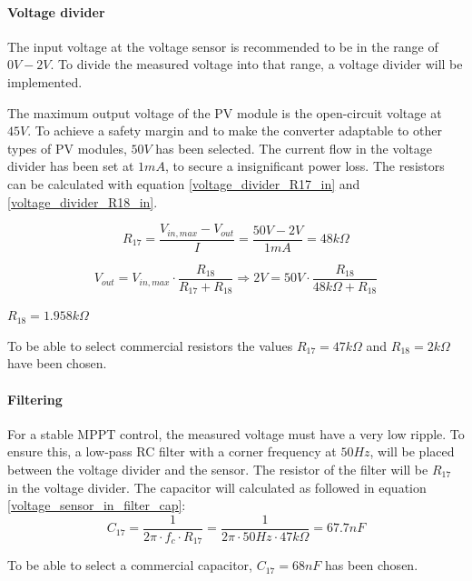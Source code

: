 \paragraph{Voltage divider}
The input voltage at the voltage sensor is recommended to be in the range of $0V-2V$. To divide the measured voltage into that range, a voltage divider will be implemented. 

The maximum output voltage of the PV module is the open-circuit voltage at $45V$. To achieve a safety margin and to make the converter adaptable to other types of PV modules, $50V$ has been selected. The current flow in the voltage divider has been set at $1mA$, to secure a insignificant power loss. The resistors can be calculated with equation \ref{voltage_divider_R17_in} and \ref{voltage_divider_R18_in}.

\begin{equation} \label{voltage_divider_R17_in}
	R_{17} = \frac{V_{in,max}-V_{out}}{I} = \frac{50V-2V}{1mA} = 48k\Omega
\end{equation}

\begin{equation} \label{voltage_divider_R18_in}
	V_{out} = V_{in,max} \cdot \frac{R_{18}}{R_{17}+R_{18}} \Rightarrow 2V = 50V \cdot \frac{R_{18}}{48k\Omega+R_{18}}
\end{equation}
\begin{center}
	$R_{18} = 1.958k\Omega$
\end{center}

To be able to select commercial resistors the values $R_{17} = 47k\Omega$ and $R_{18} = 2k\Omega$ have been chosen. 

\paragraph{Filtering} \label{voltage_sensor_filter}
For a stable MPPT control, the measured voltage must have a very low ripple. To ensure this, a low-pass RC filter with a corner frequency at $50Hz$, will be placed between the voltage divider and the sensor. The resistor of the filter will be $R_{17}$ in the voltage divider. The capacitor will calculated as followed in equation \ref{voltage_sensor_in_filter_cap}:
\begin{equation} \label{voltage_sensor_in_filter_cap}
	C_{17} = \frac{1}{2\pi \cdot f_c \cdot R_{17}} = \frac{1}{2 \pi \cdot 50Hz \cdot 47k\Omega} = 67.7nF
\end{equation}

\noindent To be able to select a commercial capacitor, $C_{17} = 68nF$ has been chosen. 

